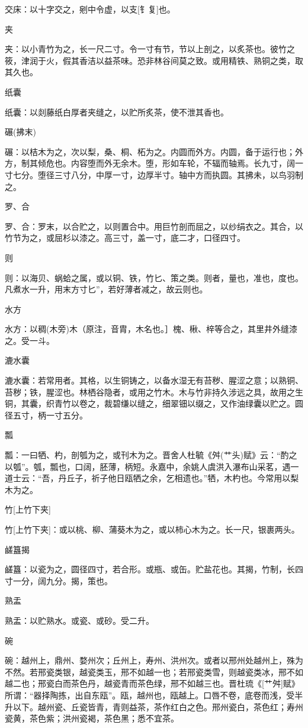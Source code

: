 \documentclass[12pt,UTF8]{ctexbook}
\begin{document}
交床：以十字交之，剜中令虚，以支[钅复]也。

夹

夹：以小青竹为之，长一尺二寸。令一寸有节，节以上剖之，以炙茶也。彼竹之筱，津润于火，假其香洁以益茶味。恐非林谷间莫之致。或用精铁、熟铜之类，取其久也。

纸囊

纸囊：以剡藤纸白厚者夹缝之，以贮所炙茶，使不泄其香也。

碾(拂末)

碾：以桔木为之，次以梨，桑、桐、柘为之。内圆而外方。内圆，备于运行也；外方，制其倾危也。内容堕而外无余木。堕，形如车轮，不辐而轴焉。长九寸，阔一寸七分。堕径三寸八分，中厚一寸，边厚半寸。轴中方而执圆。其拂未，以鸟羽制之。

罗、合

罗、合：罗末，以合贮之，以则置合中。用巨竹剖而屈之，以纱绢衣之。其合，以竹节为之，或屈杉以漆之。高三寸，盖一寸，底二才，口径四寸。

则

则：以海贝、蜗蛤之属，或以铜、铁，竹匕、策之类。则者，量也，准也，度也。凡煮水一升，用末方寸匕”，若好薄者减之，故云则也。

水方

水方：以稠(木旁)木（原注，音胄，木名也。］槐、楸、梓等合之，其里井外缝漆之。受一斗。

漉水囊

漉水囊：若常用者。其格，以生铜铸之，以备水湿无有苔秽、腥涩之意；以熟铜、苔秽；铁，腥涩也。林栖谷隐者，或用之竹木。木与竹非持久涉远之具，故用之生铜，其囊，织青竹以卷之，裁碧缣以缝之，细翠钿以缀之，又作油绿囊以贮之。圆径五寸，柄一寸五分。

瓢

瓢：一曰牺、杓，剖瓠为之，或刊木为之。晋舍人杜毓《舛(艹头)赋》云：“酌之以瓠”。瓠，瓢也，口阔，胚薄，柄短。永嘉中，余姚人虞洪入瀑布山采茗，遇一道士云：“吾，丹丘子，祈子他日瓯牺之余，乞相遗也。”牺，木杓也。今常用以梨木为之。

竹[上竹下夹]

竹[上竹下夹]：或以桃、柳、蒲葵木为之，或以柿心木为之。长一尺，银裹两头。

鹾簋揭

鹾簋：以瓷为之，圆径四寸，若合形。或瓶、或缶。贮盐花也。其揭，竹制，长四寸一分，阔九分。揭，策也。

熟盂

熟盂：以贮熟水。或瓷、或砂。受二升。

碗

碗：越州上，鼎州、婺州次；丘州上，寿州、洪州次。或者以邢州处越州上，殊为不然。若邢瓷类银，越瓷类玉，邢不如越一也；若邢瓷类雪，则越瓷类冰，邢不如越二也；邢瓷白而茶色丹，越瓷青而茶色绿，邢不如越三也。晋杜琉《[艹舛]赋》所谓：“器择陶拣，出自东瓯”。瓯，越州也，瓯越上。口唇不卷，底卷而浅，受半升以下。越州瓷、丘瓷皆青，青则益茶，茶作红白之色。邢州瓷白，茶色红；寿州瓷黄，茶色紫；洪州瓷褐，茶色黑；悉不宜茶。
\end{document}
